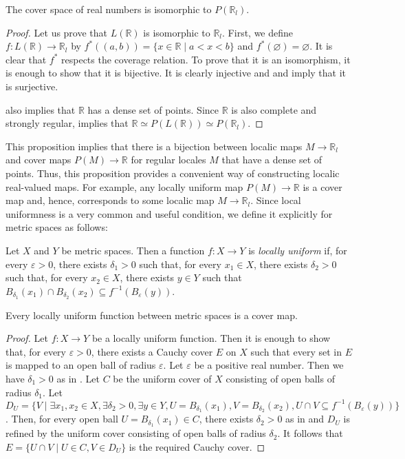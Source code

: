 \documentclass[reqno]{amsart}
\theoremstyle{definition}
\theoremstyle{remark}
\numberwithin{figure}{section}
\begin{document}
\begin{prop}
The cover space of real numbers is isomorphic to $P(\mathbb{R}_l)$.
\end{prop}
\begin{proof}
Let us prove that $L(\mathbb{R})$ is isomorphic to $\mathbb{R}_l$.
First, we define $f : L(\mathbb{R}) \to \mathbb{R}_l$ by $f^*((a,b)) = \{ x \in \mathbb{R} \mid a < x < b \}$ and $f^*(\varnothing) = \varnothing$.
It is clear that $f^*$ respects the coverage relation.
To prove that it is an isomorphism, it is enough to show that it is bijective.
It is clearly injective and  and  imply that it is surjective.

 also implies that $\mathbb{R}$ has a dense set of points.
Since $\mathbb{R}$ is also complete and strongly regular,  implies that $\mathbb{R} \simeq P(L(\mathbb{R})) \simeq P(\mathbb{R}_l)$.
\end{proof}

This proposition implies that there is a bijection between localic maps $M \to \mathbb{R}_l$ and cover maps $P(M) \to \mathbb{R}$ for regular locales $M$ that have a dense set of points.
Thus, this proposition provides a convenient way of constructing localic real-valued maps.
For example, any locally uniform map $P(M) \to \mathbb{R}$ is a cover map and, hence, corresponds to some localic map $M \to \mathbb{R}_l$.
Since local uniformness is a very common and useful condition, we define it explicitly for metric spaces as follows:

\begin{defn}
Let $X$ and $Y$ be metric spaces.
Then a function $f : X \to Y$ is \emph{locally uniform} if, for every $\varepsilon > 0$, there exists $\delta_1 > 0$ such that,
for every $x_1 \in X$, there exists $\delta_2 > 0$ such that, for every $x_2 \in X$, there exists $y \in Y$ such that $B_{\delta_1}(x_1) \cap B_{\delta_2}(x_2) \subseteq f^{-1}(B_\varepsilon(y))$.
\end{defn}

\begin{prop}
Every locally uniform function between metric spaces is a cover map.
\end{prop}
\begin{proof}
Let $f : X \to Y$ be a locally uniform function.
Then it is enough to show that, for every $\varepsilon > 0$, there exists a Cauchy cover $E$ on $X$ such that every set in $E$ is mapped to an open ball of radius $\varepsilon$.
Let $\varepsilon$ be a positive real number.
Then we have $\delta_1 > 0$ as in .
Let $C$ be the uniform cover of $X$ consisting of open balls of radius $\delta_1$.
Let $D_U = \{ V \mid \exists x_1,x_2 \in X, \exists \delta_2 > 0, \exists y \in Y, U = B_{\delta_1}(x_1), V = B_{\delta_2}(x_2), U \cap V \subseteq f^{-1}(B_\varepsilon(y)) \}$.
Then, for every open ball $U = B_{\delta_1}(x_1) \in C$, there exists $\delta_2 > 0$ as in  and $D_U$ is refined by the uniform cover consisting of open balls of radius $\delta_2$.
It follows that $E = \{ U \cap V \mid U \in C, V \in D_U \}$ is the required Cauchy cover.
\end{proof}
\end{document}
